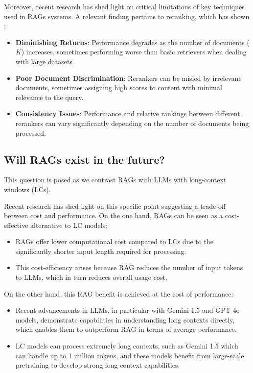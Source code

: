 Moreover, recent research has shed light on critical limitations of key techniques used in RAGs systems. A relevant finding pertains to reranking, which has shown :

\begin{itemize}
\item \textbf{Diminishing Returns}: Performance degrades as the number of documents ($K$) increases, sometimes performing worse than basic retrievers when dealing with large datasets.
\item \textbf{Poor Document Discrimination}: Rerankers can be misled by irrelevant documents, sometimes assigning high scores to content with minimal relevance to the query.
\item \textbf{Consistency Issues}: Performance and relative rankings between different rerankers can vary significantly depending on the number of documents being processed.
\end{itemize}
\subsection{Will RAGs exist in the future?}

This question is posed as we contrast RAGs with LLMs with long-context windows (LCs).

Recent research has shed light on this specific point  suggesting a trade-off between cost and performance. On the one hand, RAGs can be seen as a cost-effective alternative to LC models:
\begin{itemize}
\item RAGs offer lower computational cost compared to LCs due to the significantly shorter input length required for processing.
\item This cost-efficiency arises because RAG reduces the number of input tokens to LLMs, which in turn reduces overall usage cost.
\end{itemize}

On the other hand, this RAG benefit is achieved at the cost of performance:
\begin{itemize}
\item Recent advancements in LLMs, in particular with Gemini-1.5 and GPT-4o models, demonstrate capabilities in understanding long contexts directly, which enables them to outperform RAG in terms of average performance.
\item LC models can process extremely long contexts, such as Gemini 1.5 which can handle up to 1 million tokens, and these models benefit from large-scale pretraining to develop strong long-context capabilities.
\end{itemize}

